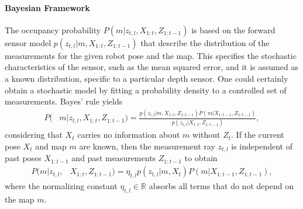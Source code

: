 \documentclass[smallextended]{svjour3}       %
\newcommand{\refeqn}[1]{(\ref{eqn:#1})}
\renewcommand{\Re}{\ensuremath{\mathbb{R}}}
\begin{document}
\paragraph{Bayesian Framework}
The occupancy probability $P(m|z_{t,l},X_{1:t},Z_{1:t-1})$ is based on the forward sensor model $p(z_{t,l}|m,X_{1:t},Z_{1:t-1})$ that describe the distribution of the measurements for the given robot pose and the map. This specifies the stochastic characteristics of the sensor, such as the mean squared error, and it is assumed as a known distribution, specific to a particular depth sensor. One could certainly obtain a stochastic model by fitting a probability density to a controlled set of measurements.
Bayes' rule yields
\begin{align}
\label{eqn:BayesRuleRayISM}
P(&m|z_{t,l},X_{1:t},Z_{1:t-1})%
=\frac{p(z_{t,l}|m,X_{1:t},Z_{1:t-1})P(m|X_{1:t-1},Z_{1:t-1})}{p(z_{t,l}|X_{1:t},Z_{1:t-1})},
\end{align}
considering that $X_t$ carries no information about $m$ without $Z_t$.
If the current pose $X_t$ and map $m$ are known, then the measurement ray $z_{t,l}$ is independent of past poses $X_{1:t-1}$ and past measurements $Z_{1:t-1}$ to obtain
\begin{align}
P(m|z_{t,l},&X_{1:t},Z_{1:t-1})%
=\eta_{t,l}p(z_{t,l}|m,X_{t})P(m|X_{1:t-1},Z_{1:t-1}),
\end{align}
where the normalizing constant $\eta_{t,l}\in\Re$ absorbs all terms that do not depend on the map $m$.

\end{document}
